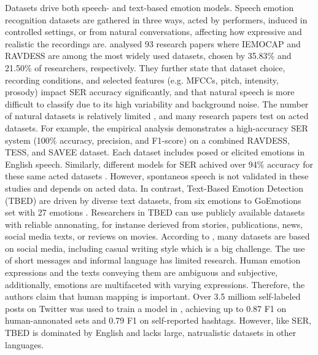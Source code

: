\medskip
Datasets drive both speech- and text-based emotion models.  Speech emotion recognition datasets are gathered in three ways, acted by performers, induced in controlled settings, or from natural conversations, affecting how expressive and realistic the recordings are. \textcite{Rathi2024} analysed 93 research papers where IEMOCAP and RAVDESS are among the most widely used datasets, chosen by 35.83\% and 21.50\% of researchers, respectively. They further state that dataset choice, recording conditions, and selected features (e.g. MFCCs, pitch, intensity, prosody) impact SER accuracy significantly, and that natural speech is more difficult to classify due to its high variability and background noise.
The number of natural datasets is relatively limited \autocite{Cai2023}, and many research papers test on acted datasets. For example, the empirical analysis \textcite{Ahammed2024} demonstrates a high-accuracy SER system (100\% accuracy, precision, and F1-score) on a combined RAVDESS, TESS, and SAVEE dataset. Each dataset includes posed or elicited emotions in English speech. Similarly, different models for SER achived over 94\% accuracy for these same acted datasets \autocite{Alroobaea2024}. However, spontaneos speech is not validated in these studies and depends on acted data. 
In contrast, Text-Based Emotion Detection (TBED) are driven by diverse text datasets, from six emotions to GoEmotions set with 27 emotions \autocite{Kusal2023}. Researchers in TBED can use publicly available datasets with reliable annonating, for instanse derieved from stories, publications, news, social media texts, or reviews on movies. According to \textcite{Kusal2023}, many datasets are based on social media, including casual writing style which is a big challenge. The use of short messages and informal language has limited research. Human emotion expressions and the texts conveying them are ambiguous and subjective, additionally, emotions are multifaceted with varying expressions. Therefore, the authors claim that human mapping is important. Over 3.5 milliom self-labeled posts on Twitter was used to train a model in \textcite{Lee2023} , achieving up to 0.87 F1 on human-annonated sets and 0.79 F1 on self-reported hashtags. However, like SER, TBED is dominated by English and lacks large, natrualistic datasets in other languages. 

